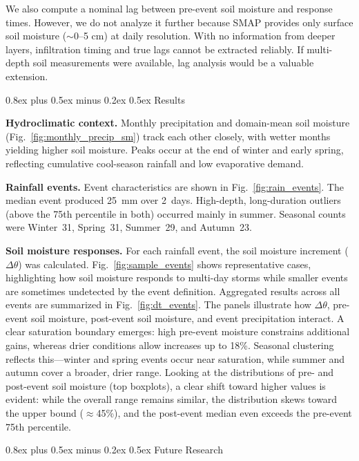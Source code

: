 \documentclass[9pt, twocolumn]{extarticle}
\makeatletter
\renewcommand\section{\@startsection{section}{1}{0pt}%
  {0.8ex plus 0.5ex minus 0.2ex}%
  {0.5ex}%
  {\normalfont\Large\bfseries}}
\makeatother
\begin{document}
We also compute a nominal lag between pre-event soil moisture and response times. However, we do not analyze it further because SMAP provides only surface soil moisture (\(\sim\)0--5 cm) at daily resolution. With no information from deeper layers, infiltration timing and true lags cannot be extracted reliably. If multi-depth soil measurements were available, lag analysis would be a valuable extension.  

\section{Results}

\textbf{Hydroclimatic context.} Monthly precipitation and domain-mean soil moisture (Fig.~\ref{fig:monthly_precip_sm}) track each other closely, with wetter months yielding higher soil moisture. Peaks occur at the end of winter and early spring, reflecting cumulative cool-season rainfall and low evaporative demand.

\textbf{Rainfall events.} Event characteristics are shown in Fig.~\ref{fig:rain_events}. The median event produced 25~mm over 2~days. High-depth, long-duration outliers (above the 75th percentile in both) occurred mainly in summer. Seasonal counts were Winter~31, Spring~31, Summer~29, and Autumn~23.

\textbf{Soil moisture responses.} For each rainfall event, the soil moisture increment ($\Delta \theta$) was calculated. Fig.~\ref{fig:sample_events} shows representative cases, highlighting how soil moisture responds to multi-day storms while smaller events are sometimes undetected by the event definition. Aggregated results across all events are summarized in Fig.~\ref{fig:dt_events}. The panels illustrate how $\Delta \theta$, pre-event soil moisture, post-event soil moisture, and event precipitation interact. A clear saturation boundary emerges: high pre-event moisture constrains additional gains, whereas drier conditions allow increases up to 18\%. Seasonal clustering reflects this—winter and spring events occur near saturation, while summer and autumn cover a broader, drier range. Looking at the distributions of pre- and post-event soil moisture (top boxplots), a clear shift toward higher values is evident: while the overall range remains similar, the distribution skews toward the upper bound ($\approx$45\%), and the post-event median even exceeds the pre-event 75th percentile.

\section{Future Research}
\end{document}
